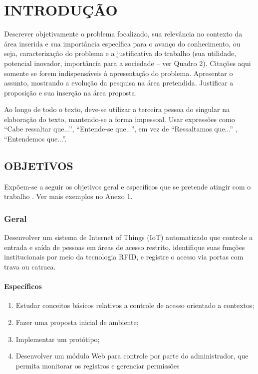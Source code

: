 \chapter{INTRODUÇÃO}\label{chp:INTRODUCAO}

Descrever objetivamente o problema focalizado, sua relevância no contexto da área inserida e sua importância específica para o avanço do conhecimento, ou seja, caracterização do problema e a justificativa do trabalho (sua utilidade, potencial inovador, importância para a sociedade – ver Quadro 2). Citações aqui somente se forem indispensáveis à apresentação do problema. Apresentar o assunto, mostrando a evolução da pesquisa na área pretendida. Justificar a proposição e sua inserção na área proposta. 

Ao longo de todo o texto, deve-se utilizar a terceira pessoa do singular na elaboração do texto, mantendo-se a forma impessoal. Usar expressões como “Cabe ressaltar que...”, “Entende-se que...”, em vez de “Ressaltamos que...” , “Entendemos que...”. 


\section{OBJETIVOS}\label{sec:OBJETIVOS}
Expõem-se a seguir os objetivos geral e específicos que se pretende atingir com o trabalho . Ver mais exemplos no Anexo 1. 

\subsection{Geral}\label{sec:Geral}
Desenvolver um sistema de Internet of Things (IoT) automatizado que controle a entrada e saída de pessoas em áreas de acesso restrito, identifique suas funções institucionais por meio da tecnologia RFID, e registre o acesso via portas com trava ou catraca.


\subsubsection{Específicos}\label{sec:Especificos}
\begin{enumerate}
	\item Estudar conceitos básicos relativos a controle de acesso orientado a contextos; 
	
	\item Fazer uma proposta inicial de ambiente;
	
	\item Implementar um protótipo;
	
	\item Desenvolver um módulo Web para controle por parte do administrador, que permita monitorar os registros e gerenciar permissões
\end{enumerate}



